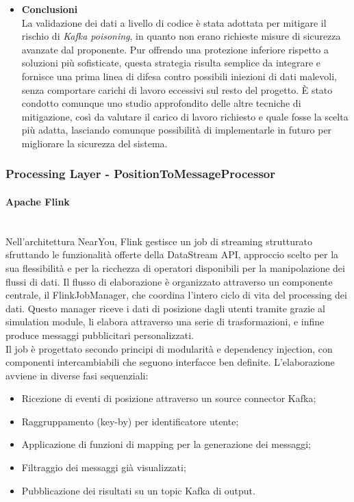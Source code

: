 \documentclass[10pt]{article}
\newcommand{\myparagraph}[1]{\paragraph{#1}\mbox{}\\}
\begin{document}
\begin{itemize}
\begin{itemize}
\begin{itemize}
                \end{itemize}
            \end{itemize}
            \item \textbf{Conclusioni}\\
                La validazione dei dati a livello di codice è stata adottata per mitigare il rischio di \textit{Kafka poisoning}, in quanto non erano richieste misure di sicurezza avanzate dal proponente. Pur offrendo una protezione inferiore rispetto a soluzioni più sofisticate, questa strategia risulta semplice da integrare e fornisce una prima linea di difesa contro possibili iniezioni di dati malevoli, senza comportare carichi di lavoro eccessivi sul resto del progetto. È stato condotto comunque uno studio approfondito delle altre tecniche di mitigazione, così da valutare il carico di lavoro richiesto e quale fosse la scelta più adatta, lasciando comunque possibilità di implementarle in futuro per migliorare la sicurezza del sistema.\\
        \end{itemize}
        









        \subsubsection{Processing Layer - PositionToMessageProcessor}
        \myparagraph{Apache Flink}
        Nell'architettura NearYou, Flink gestisce un job di streaming strutturato sfruttando le funzionalità offerte della DataStream API,
        approccio scelto per la sua flessibilità e per la ricchezza di operatori disponibili per la manipolazione dei flussi di dati.
        Il flusso di elaborazione è organizzato attraverso un componente centrale, il FlinkJobManager, che coordina l'intero ciclo di vita del processing dei dati.
        Questo manager riceve i dati di posizione dagli utenti tramite grazie al simulation module, li elabora attraverso una serie di trasformazioni, e infine produce messaggi pubblicitari personalizzati. \\
        Il job è progettato secondo principi di modularità e dependency injection, con componenti intercambiabili che seguono interfacce ben definite.
        L'elaborazione avviene in diverse fasi sequenziali:

        \begin{itemize}
            \item Ricezione di eventi di posizione attraverso un source connector Kafka;
            \item Raggruppamento (key-by) per identificatore utente;
            \item Applicazione di funzioni di mapping per la generazione dei messaggi;
            \item Filtraggio dei messaggi già visualizzati;
            \item Pubblicazione dei risultati su un topic Kafka di output.
        \end{itemize}
\end{document}
